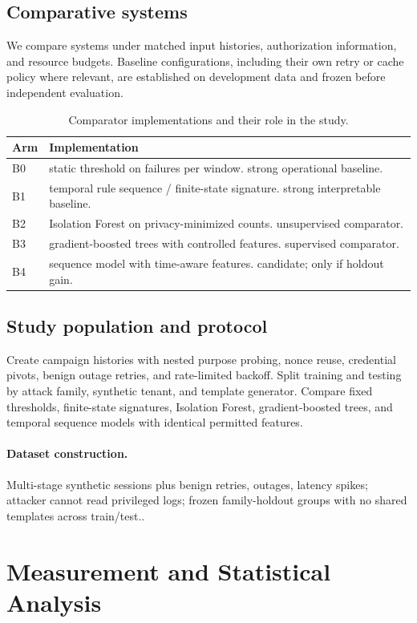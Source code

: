 \documentclass[11pt,a4paper]{article}
\begin{document}
\subsection{Comparative systems}
We compare systems under matched input histories, authorization information, and resource budgets. Baseline configurations, including their own retry or cache policy where relevant, are established on development data and frozen before independent evaluation.
\begin{table}[ht]
\centering\footnotesize
\caption{Comparator implementations and their role in the study.}
\begin{tabularx}{\linewidth}{@{}lX@{}}\toprule
Arm & Implementation \\ \midrule
B0 & static threshold on failures per window. strong operational baseline. \\ 
B1 & temporal rule sequence / finite-state signature. strong interpretable baseline. \\ 
B2 & Isolation Forest on privacy-minimized counts. unsupervised comparator. \\ 
B3 & gradient-boosted trees with controlled features. supervised comparator. \\ 
B4 & sequence model with time-aware features. candidate; only if holdout gain. \\ 
\bottomrule\end{tabularx}
\end{table}

\subsection{Study population and protocol}
Create campaign histories with nested purpose probing, nonce reuse, credential pivots, benign outage retries, and rate-limited backoff. Split training and testing by attack family, synthetic tenant, and template generator. Compare fixed thresholds, finite-state signatures, Isolation Forest, gradient-boosted trees, and temporal sequence models with identical permitted features.

\paragraph{Dataset construction.} Multi-stage synthetic sessions plus benign retries, outages, latency spikes; attacker cannot read privileged logs; frozen family-holdout groups with no shared templates across train/test..

\section{Measurement and Statistical Analysis}
\end{document}
